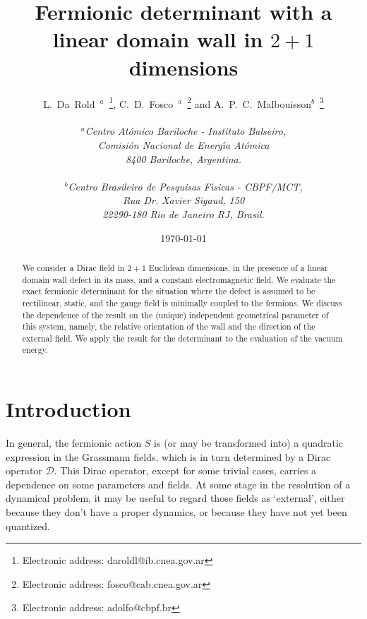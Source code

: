 \documentclass[a4paper,12pt]{article}
\begin{document}
\title{Fermionic determinant with a linear domain wall in $2+1$
  dimensions} 
\author{L.~Da~Rold~$^a$~\footnote{Electronic address:
    daroldl@ib.cnea.gov.ar}, C.~D.~Fosco~$^a$~\footnote{Electronic
    address: fosco@cab.cnea.gov.ar} and
  A.~P.~C.~Malbouisson$^b$~\footnote{Electronic address:
    adolfo@cbpf.br}
  \\
  \\
  \normalsize{\it $^a$Centro At\' omico Bariloche - Instituto
    Balseiro,}\\ \normalsize{\it Comisi{\'o}n Nacional de Energ\'{\i}a
    At{\'o}mica}\\ \normalsize{\it 8400 Bariloche, Argentina.}\\
  \\
  \normalsize{\it $^b$Centro Brasileiro de Pesquisas F\'{{\i}}sicas - CBPF/MCT,}\\
  \normalsize{\it Rua Dr. Xavier Sigaud, 150}\\
  \normalsize{\it 22290-180 Rio de Janeiro RJ, Brasil.}}
\date{\today} \maketitle
\begin{abstract}
\noindent We consider a Dirac field in $2+1$ Euclidean dimensions, 
in the presence of a linear domain wall defect in its mass, and a
constant electromagnetic field.  We evaluate the exact fermionic
determinant for the situation where the defect is assumed to be
rectilinear, static, and the gauge field is minimally coupled to the
fermions. We discuss the dependence of the result on the (unique)
independent geometrical parameter of this system, namely, the relative
orientation of the wall and the direction of the external field.  We
apply the result for the determinant to the evaluation of the vacuum
energy.
\end{abstract}
\newpage
\section{Introduction}
In general, the fermionic action $S$ is (or may be transformed into) a
quadratic expression in the Grassmann fields, which is in turn
determined by a Dirac operator ${\mathcal D}$. This Dirac operator,
except for some trivial cases, carries a dependence on some parameters
and fields. At some stage in the resolution of a dynamical problem, it
may be useful to regard those fields as `external', either because
they don't have a proper dynamics, or because they have not yet been
quantized.
\end{document}
